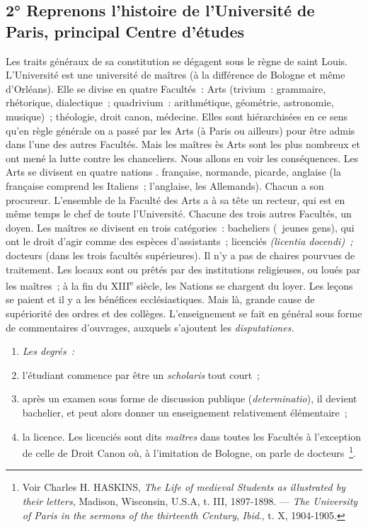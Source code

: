 \documentclass[french,twoside]{book} %
\newlength{\listmod}
\newcommand{\listhead}[1]{\hspace{-1\listmod}\emph{#1}}
\begin{document}
\subsection[{2° Reprenons l’histoire de l’Université de Paris, principal Centre d’études}]{2° Reprenons l’histoire de l’Université de Paris, principal Centre d’études}
\noindent Les traits généraux de sa constitution se dégagent sous le règne de saint Louis. L’Université est une université de maîtres (à la différence de Bologne et même d’Orléans). Elle se divise en quatre Facultés : Arts (trivium : grammaire, rhétorique, dialectique ; quadrivium : arithmétique, géométrie, astronomie, musique) ; théologie, droit canon, médecine. Elles sont hiérarchisées en ce sens qu’en règle générale on a passé par les Arts (à Paris ou ailleurs) pour être admis dans l’une des autres Facultés. Mais les maîtres ès Arts sont les plus nombreux et ont mené la lutte contre les chanceliers. Nous allons en voir les conséquences. Les Arts se divisent en quatre nations . française, normande, picarde, anglaise (la française comprend les Italiens ; l’anglaise, les Allemands). Chacun a son procureur. L’ensemble de la Faculté des Arts a à sa tête un recteur, qui est en même temps le chef de toute l’Université. Chacune des trois autres Facultés, un doyen. Les maîtres se divisent en trois catégories : bacheliers ( jeunes gens), qui ont le droit d’agir comme des espèces d’assistants ; licenciés {\itshape (licentia docendi) ;} docteurs (dans les trois facultés supérieures). Il n’y a pas de chaires pourvues de traitement. Les locaux sont ou prêtés par des institutions religieuses, ou loués par les maîtres ; à la fin du XIII\textsuperscript{e} siècle, les Nations se chargent du loyer. Les leçons se paient et il y a les bénéfices ecclésiastiques. Mais là, grande cause de supériorité des ordres et des collèges. L’enseignement se fait en général sous forme de commentaires d’ouvrages, auxquels s’ajoutent les {\itshape disputationes.}\par

\begin{enumerate}[itemsep=0pt,]
\item[]\listhead{Les degrés :}
\item l’étudiant commence par être un {\itshape scholaris} tout court ;
\item après un examen sous forme de discussion publique ({\itshape determinatio}), il devient bachelier, et peut alors donner un enseignement relativement élémentaire ;
\item la licence. Les licenciés sont dits \emph{maîtres} dans toutes les Facultés à l’exception de celle de Droit Canon où, à l’imitation de Bologne, on parle de docteurs \footnote{ Voir Charles H. HASKINS, {\itshape The Life of medieval Students as illustrated by their letters}, Madison, Wisconsin, U.S.A, t. III, 1897-1898. — {\itshape The University of Paris in the sermons of the thirteenth Century}, {\itshape Ibid}., t. X, 1904-1905.}.
\end{enumerate}
\end{document}
